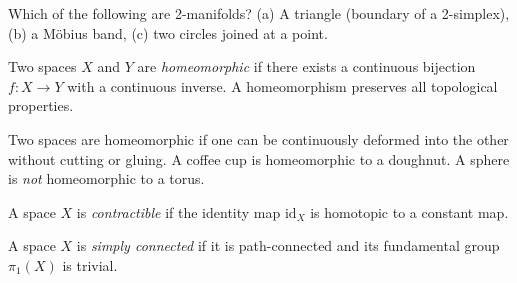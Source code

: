 \begin{checkyou}
Which of the following are 2-manifolds? (a) A triangle (boundary of a 2-simplex), (b) a Möbius band, (c) two circles joined at a point.
\end{checkyou}

\begin{definition}
Two spaces $X$ and $Y$ are \textit{homeomorphic} if there exists a continuous bijection $f: X \to Y$ with a continuous inverse. A homeomorphism preserves all topological properties.
\end{definition}

\begin{remark}
Two spaces are homeomorphic if one can be continuously deformed into the other without cutting or gluing. A coffee cup is homeomorphic to a doughnut. A sphere is \emph{not} homeomorphic to a torus.
\end{remark}

\begin{definition}
A space $X$ is \textit{contractible} if the identity map $\mathrm{id}_X$ is homotopic to a constant map.
\end{definition}

\begin{definition}
A space $X$ is \textit{simply connected} if it is path-connected and its fundamental group $\pi_1(X)$ is trivial.
\end{definition}

